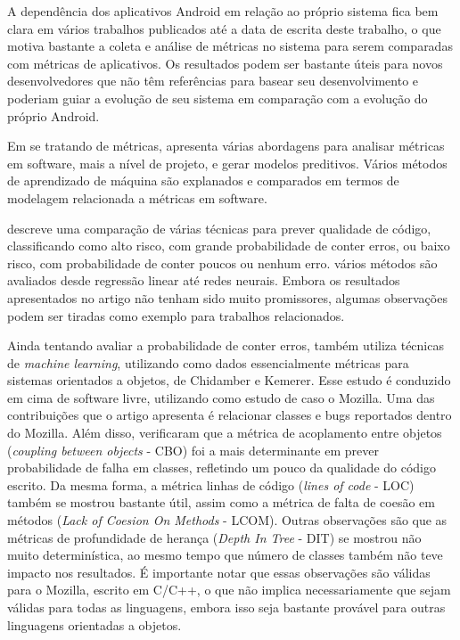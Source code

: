 A dependência dos aplicativos Android em relação ao próprio sistema fica bem clara em vários trabalhos publicados até a data de escrita deste trabalho, o que motiva bastante a coleta e análise de métricas no sistema para serem comparadas com métricas de aplicativos. Os resultados podem ser bastante úteis para novos desenvolvedores que não têm referências para basear seu desenvolvimento e poderiam guiar a evolução de seu sistema em comparação com a evolução do próprio Android.

Em se tratando de métricas,  apresenta várias abordagens para analisar métricas em software, mais a nível de projeto, e gerar modelos preditivos. Vários métodos de aprendizado de máquina são explanados e comparados em termos de modelagem relacionada a métricas em software. 

 descreve uma comparação de várias técnicas para prever qualidade de código, classificando como alto risco, com grande probabilidade de conter erros, ou baixo risco, com probabilidade de conter poucos ou nenhum erro. vários métodos são avaliados desde regressão linear até redes neurais. Embora os resultados apresentados no artigo não tenham sido muito promissores, algumas observações podem ser tiradas como exemplo para trabalhos relacionados. 

Ainda tentando avaliar a probabilidade de conter erros,  também utiliza técnicas de \textit{machine learning}, utilizando como dados essencialmente métricas para sistemas orientados a objetos, de Chidamber e Kemerer. Esse estudo é conduzido em cima de software livre, utilizando como estudo de caso o Mozilla. Uma das contribuições que o artigo apresenta é relacionar classes e bugs reportados dentro do Mozilla. Além disso, verificaram que a métrica de acoplamento entre objetos (\textit{coupling between objects} - CBO) foi a mais determinante em prever probabilidade de falha em classes, refletindo um pouco da qualidade do código escrito. Da mesma forma, a métrica linhas de código (\textit{lines of code} - LOC) também se mostrou bastante útil, assim como a métrica de falta de coesão em métodos (\textit{Lack of Coesion On Methods} - LCOM). Outras observações são que as métricas de profundidade de herança (\textit{Depth In Tree} - DIT) se mostrou não muito determinística, ao mesmo tempo que  número de classes também não teve impacto nos resultados. É importante notar que essas observações são válidas para o Mozilla, escrito em C/C++, o que não implica necessariamente que sejam válidas para todas as linguagens, embora isso seja bastante provável para outras linguagens orientadas a objetos.

